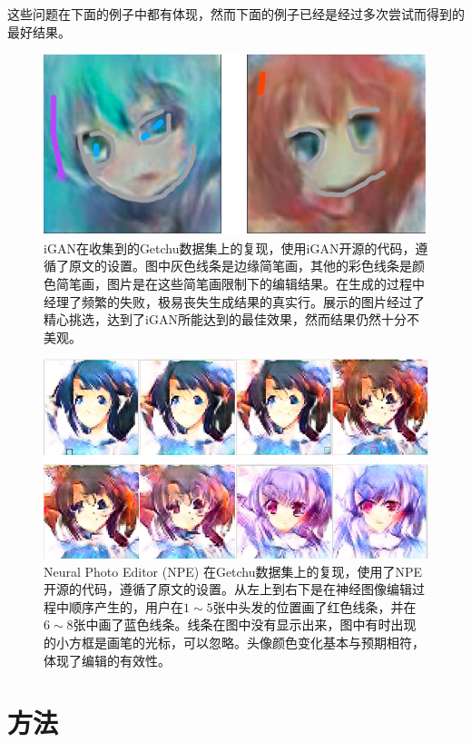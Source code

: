 \documentclass[a4paper,12pt,UTF8]{ctexart}
\newcommand{\kai}{\CJKfamily{zhkai}}	%
\begin{document}
这些问题在下面的例子中都有体现，然而下面的例子已经是经过多次尝试而得到的最好结果。

\begin{figure}[H]
  \centering
  \includegraphics[width=0.9\linewidth]{figs/baseline1.PNG}
  \caption{\kai iGAN在收集到的Getchu数据集上的复现，使用iGAN开源的代码，遵循了原文的设置。图中灰色线条是边缘简笔画，其他的彩色线条是颜色简笔画，图片是在这些简笔画限制下的编辑结果。在生成的过程中经理了频繁的失败，极易丧失生成结果的真实行。展示的图片经过了精心挑选，达到了iGAN所能达到的最佳效果，然而结果仍然十分不美观。}
  \label{fig:baseline1}
\end{figure}

\begin{figure}[H]
  \centering
  \includegraphics[width=0.9\linewidth]{figs/baseline2.PNG}
  \caption{\kai Neural Photo Editor (NPE) 在Getchu数据集上的复现，使用了NPE开源的代码，遵循了原文的设置。从左上到右下是在神经图像编辑过程中顺序产生的，用户在$1\sim5$张中头发的位置画了红色线条，并在 $6\sim8$张中画了蓝色线条。线条在图中没有显示出来，图中有时出现的小方框是画笔的光标，可以忽略。头像颜色变化基本与预期相符，体现了编辑的有效性。}
  \label{fig:baseline2}
\end{figure}

\section{方法}
\end{document}
